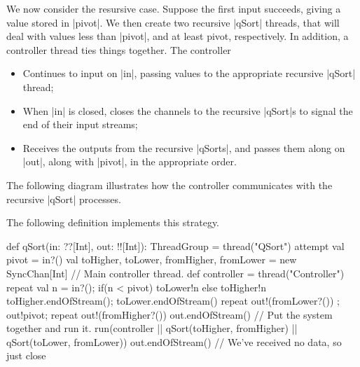 We now consider the resursive case.  Suppose the first input succeeds, giving
a value stored in |pivot|.  We then create two recursive |qSort| threads, that
will deal with values less than |pivot|, and at least pivot, respectively.  In
addition, a controller thread ties things together.  The controller
%
\begin{itemize}
\item Continues to input on |in|, passing values to the appropriate recursive
  |qSort| thread;

\item When |in| is closed, closes the channels to the recursive |qSort|s to
  signal the end of their input streams;

\item Receives the outputs from the recursive |qSorts|, and passes them along
  on |out|, along with |pivot|, in the appropriate order.
\end{itemize}
%
The following diagram illustrates how the controller communicates with the
recursive |qSort| processes.
%
\begin{center}
\end{center}


The following definition implements this strategy.
%
\begin{scala}
  def qSort(in: ??[Int], out: !![Int]): ThreadGroup = thread("QSort"){
    attempt{
      val pivot = in?()
      val toHigher, toLower, fromHigher, fromLower = new SyncChan[Int]
      // Main controller thread.
      def controller = thread("Controller"){
        repeat{ val n = in?(); if(n < pivot) toLower!n else toHigher!n }
	toHigher.endOfStream(); toLower.endOfStream()
        repeat{ out!(fromLower?()) }; out!pivot; repeat{ out!(fromHigher?()) }
        out.endOfStream()
      }      
      // Put the system together and run it.
      run(controller || qSort(toHigher, fromHigher) || qSort(toLower, fromLower))
    }{ out.endOfStream() } // We've received no data, so just close
  }
\end{scala}

